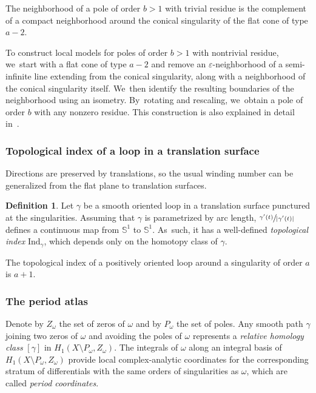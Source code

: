 \documentclass[JEP,XML,SOM,Unicode,NoFloatCountersInSection,published]{cedram}
\let\epsilon\varepsilon
\theoremstyle{definition}
\newtheorem{defn}[thm]{Definition}
\begin{document}
The neighborhood of a pole of order $b>1$ with trivial residue is the complement of a compact neighborhood around the conical singularity of the flat cone of type $a-2$.

To construct local models for poles of order $b>1$ with nontrivial residue, we~start with a flat cone of type $a-2$ and remove an $\epsilon$-neighborhood of a semi-infinite line extending from the conical singularity, along with a neighborhood of the conical singularity itself. We~then identify the resulting boundaries of the neighborhood using an isometry. By~rotating and rescaling, we~obtain a pole of order $b$ with any nonzero residue. This construction is also explained in detail in~\cite{Bo}.

\subsubsection{Topological index of a loop in a translation surface}\label{sub:rotation}

Directions are preserved by translations, so the usual winding number can be generalized from the flat plane to translation surfaces.
\begin{defn}
Let $\gamma$ be a smooth oriented loop in a translation surface punctured at the singularities. Assuming that $\gamma$ is parametrized by arc length, $\sfrac{\gamma'(t)}{|\gamma'(t)|}$ defines a continuous map from $\mathbb{S}^{1}$ to $\mathbb{S}^{1}$. As~such, it has a well-defined \textit{topological index} $\mathrm{Ind}_{\gamma}$, which depends only on the homotopy class of $\gamma$.
\end{defn}

The topological index of a positively oriented loop around a singularity of order $a$ is $a+1$.

\label{sec:periodcoor}

\subsubsection{The period atlas}

Denote by $Z_{\omega}$ the set of zeros of $\omega$ and by $P_{\omega}$ the set of poles. Any smooth path $\gamma$ joining two zeros of $\omega$ and avoiding the poles of $\omega$ represents a \textit{relative homology class} $[\gamma]$ in $H_{1}(X \setminus P_{\omega},Z_{\omega})$. The integrals of $\omega$ along an integral basis of $H_{1}(X \setminus P_{\omega},Z_{\omega})$ provide local complex-analytic coordinates for the corresponding stratum of differentials with the same orders of singularities as $\omega$, which are called {\em period coordinates}.
\end{document}
